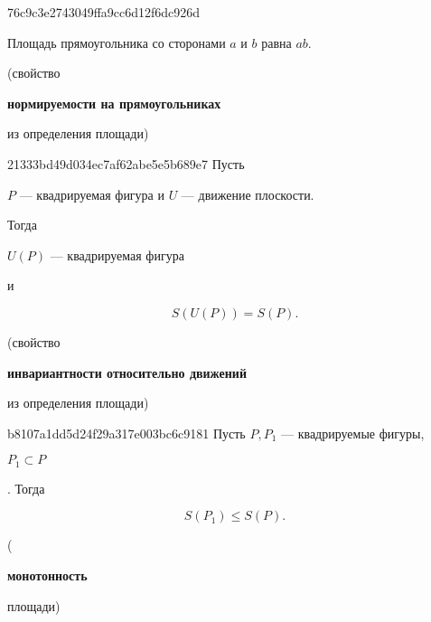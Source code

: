 \begin{note}{76c9c3e2743049ffa9cc6d12f6dc926d}
    \begin{icloze}{1}Площадь прямоугольника со сторонами \({ a }\) и \({ b }\) равна \({ a b }\).\end{icloze}

    \begin{center}
        \tiny
        (свойство \begin{icloze}{2}\textbf{нормируемости на прямоугольниках}\end{icloze} из определения площади)
    \end{center}
\end{note}

\begin{note}{21333bd49d034ec7af62abe5e5b689e7}
    Пусть \begin{icloze}{3}\({ P }\) --- квадрируемая фигура и \({ U }\) --- движение плоскости.\end{icloze}
    Тогда \begin{icloze}{1}\({ U(P) }\) --- квадрируемая фигура\end{icloze} и
    \begin{icloze}{2}
        \[
            S(U(P)) = S(P).
        \]
    \end{icloze}

    \begin{center}
        \tiny
        (свойство \begin{icloze}{4}\textbf{инвариантности относительно движений}\end{icloze} из определения площади)
    \end{center}
\end{note}

\begin{note}{b8107a1dd5d24f29a317e003bc6c9181}
    Пусть \({ P, P_1 }\) --- квадрируемые фигуры, \begin{icloze}{2}\({ P_1 \subset P }\)\end{icloze}.
    Тогда
    \begin{icloze}{1}
        \[
            S(P_1) \leqslant S(P).
        \]
    \end{icloze}

    \begin{center}
        \tiny
        (\begin{icloze}{3}\textbf{монотонность}\end{icloze} площади)
    \end{center}
\end{note}

